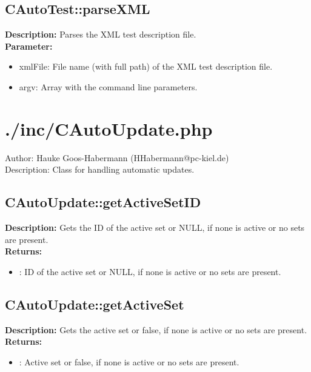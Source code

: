 \subsection{CAutoTest::parseXML}
\textbf{Description:} Parses the XML test description file.\\
\textbf{Parameter:}
\begin{itemize}
\item xmlFile: File name (with full path) of the XML test description file.
\item argv: Array with the command line parameters.
\end{itemize}

\newpage\section{./inc/CAutoUpdate.php}
 Author: Hauke Goos-Habermann (HHabermann@pc-kiel.de)\\
 Description: Class for handling automatic updates.\\

\subsection{CAutoUpdate::getActiveSetID}
\textbf{Description:} Gets the ID of the active set or NULL, if none is active or no sets are present.\\
\textbf{Returns:}
\begin{itemize}
\item : ID of the active set or NULL, if none is active or no sets are present.
\end{itemize}

\subsection{CAutoUpdate::getActiveSet}
\textbf{Description:} Gets the active set or false, if none is active or no sets are present.\\
\textbf{Returns:}
\begin{itemize}
\item : Active set or false, if none is active or no sets are present.
\end{itemize}

